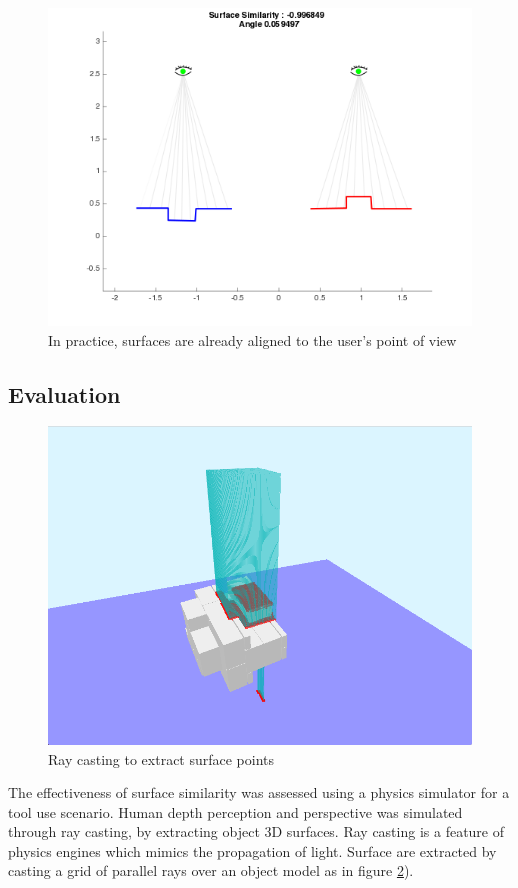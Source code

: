 \documentclass[11]{article}
\begin{document}
\begin{figure}[!h]
  \centering
  \includegraphics[width=.6\textwidth]{figures/same_orientation.png}
  \caption{In practice, surfaces are already aligned to the user's point of view}
  \label{fig:same_orientation}
\end{figure}  

\subsection{Evaluation}

\begin{figure}[!h]
  \centering
  \includegraphics[width=.7\textwidth]{figures/raycasting.png}
  \caption{Ray casting to extract surface points}
  \label{fig:raycasting}
\end{figure}  

The effectiveness of surface similarity was assessed using a physics simulator for a tool use scenario. 
Human depth perception and perspective was simulated through ray casting, by extracting object 3D surfaces. 
Ray casting is a feature of physics engines which mimics the propagation of light. 
Surface are extracted by casting a grid of parallel rays over an object model as in figure \ref{fig:raycasting}). 
\end{document}
